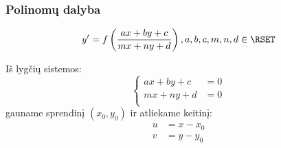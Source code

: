 \subsubsection{Polinomų dalyba}

\begin{equation*}
  y' = f \left( \frac{ax + by + c}{mx + ny + d} \right),
  a, b, c, m, n, d \in \RSET
\end{equation*}

Iš lygčių sistemos:
\begin{equation*}
  \left\{%
  \begin{aligned}
    ax + by + c &= 0 \\
    mx + ny + d &= 0 \\
  \end{aligned}%
  \right.
\end{equation*}
gauname sprendinį $(x_{0}, y_{0})$ ir atliekame keitinį:
\begin{align*}
  u &= x - x_{0} \\
  v &= y - y_{0} \\
\end{align*}
